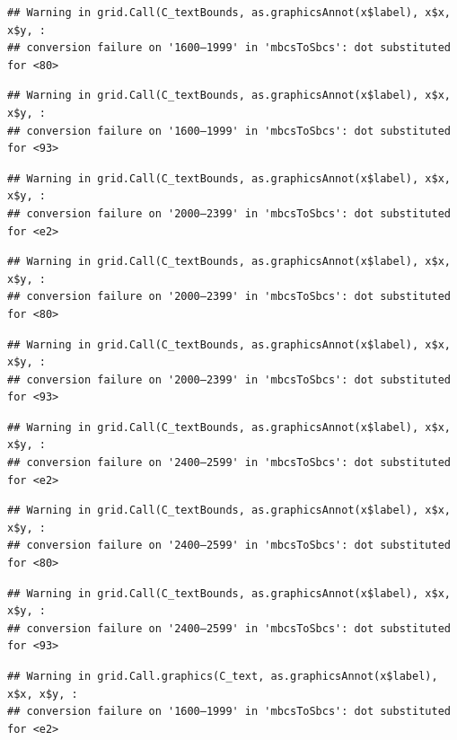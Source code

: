 \documentclass[
]{article}
\begin{document}
\begin{verbatim}
## Warning in grid.Call(C_textBounds, as.graphicsAnnot(x$label), x$x, x$y, :
## conversion failure on '1600–1999' in 'mbcsToSbcs': dot substituted for <80>
\end{verbatim}

\begin{verbatim}
## Warning in grid.Call(C_textBounds, as.graphicsAnnot(x$label), x$x, x$y, :
## conversion failure on '1600–1999' in 'mbcsToSbcs': dot substituted for <93>
\end{verbatim}

\begin{verbatim}
## Warning in grid.Call(C_textBounds, as.graphicsAnnot(x$label), x$x, x$y, :
## conversion failure on '2000–2399' in 'mbcsToSbcs': dot substituted for <e2>
\end{verbatim}

\begin{verbatim}
## Warning in grid.Call(C_textBounds, as.graphicsAnnot(x$label), x$x, x$y, :
## conversion failure on '2000–2399' in 'mbcsToSbcs': dot substituted for <80>
\end{verbatim}

\begin{verbatim}
## Warning in grid.Call(C_textBounds, as.graphicsAnnot(x$label), x$x, x$y, :
## conversion failure on '2000–2399' in 'mbcsToSbcs': dot substituted for <93>
\end{verbatim}

\begin{verbatim}
## Warning in grid.Call(C_textBounds, as.graphicsAnnot(x$label), x$x, x$y, :
## conversion failure on '2400–2599' in 'mbcsToSbcs': dot substituted for <e2>
\end{verbatim}

\begin{verbatim}
## Warning in grid.Call(C_textBounds, as.graphicsAnnot(x$label), x$x, x$y, :
## conversion failure on '2400–2599' in 'mbcsToSbcs': dot substituted for <80>
\end{verbatim}

\begin{verbatim}
## Warning in grid.Call(C_textBounds, as.graphicsAnnot(x$label), x$x, x$y, :
## conversion failure on '2400–2599' in 'mbcsToSbcs': dot substituted for <93>
\end{verbatim}

\begin{verbatim}
## Warning in grid.Call.graphics(C_text, as.graphicsAnnot(x$label), x$x, x$y, :
## conversion failure on '1600–1999' in 'mbcsToSbcs': dot substituted for <e2>
\end{verbatim}
\end{document}
